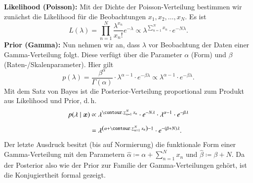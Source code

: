 \textbf{Likelihood (Poisson):} Mit der Dichte der Poisson-Verteilung bestimmen wir zunächst die Likelihood für die Beobachtungen $x_1, x_2, \ldots, x_N$. Es ist
\begin{equation*}
	L(\lambda)
		= \prod_{n=1}^N \frac{\lambda^{x_n}}{x_n!} e^{-\lambda}
		\propto \lambda^{\sum_{n=1}^N x_n} \cdot e^{-N \lambda}.
\end{equation*}
\textbf{Prior (Gamma):} Nun nehmen wir an, dass $\lambda$ vor Beobachtung der Daten einer Gamma-Verteilung folgt. Diese verfügt über die Parameter $\alpha$ (Form) und $\beta$ (Raten-/Skalenparameter). Hier gilt
\begin{equation*}
	p(\lambda)
		= \frac{\beta^\alpha}{\Gamma(\alpha)} \cdot \lambda^{\alpha - 1} \cdot e^{-\beta \lambda}
		\propto \lambda^{\alpha - 1} \cdot e^{-\beta \lambda}.
\end{equation*}
Mit dem Satz von Bayes ist die Posterior-Verteilung proportional zum Produkt aus Likelihood und Prior, d.\,h.
\begin{align*}
	p(\lambda \mid \bx)
		&\propto \lambda^{\sum_{n=1}^N x_n} \cdot e^{-N \lambda} \cdot \lambda^{\alpha - 1} \cdot e^{-\beta \lambda}
\\[2mm]
		&= \lambda^{\left( \alpha + \sum_{n=1}^N x_n \right) - 1} \cdot e^{-(\beta + N) \lambda}.
\end{align*}
Der letzte Ausdruck besitzt (bis auf Normierung) die funktionale Form einer Gamma-Verteilung mit den Parametern $\hat{\alpha} \coloneqq \alpha + \sum_{n=1}^N x_n$ und $\hat{\beta} \coloneqq \beta + N$. Da der Posterior also wie der Prior zur Familie der Gamma-Verteilungen gehört, ist die Konjugiertheit formal gezeigt.


\newpage